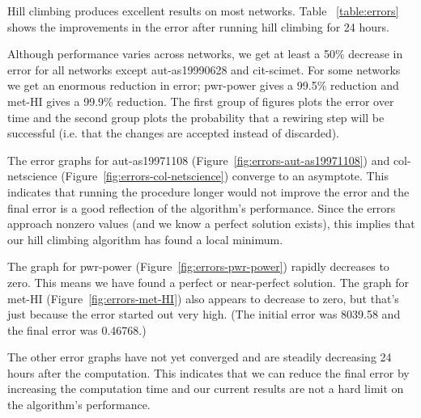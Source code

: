 Hill climbing produces excellent results on most networks.  Table ~\ref{table:errors} shows the improvements in the error after running hill climbing for 24 hours.

Although performance varies across networks, we get at least a 50\% decrease in error for all networks except aut-as19990628 and cit-scimet.  For some networks we get an enormous reduction in error; pwr-power gives a 99.5\% reduction and met-HI gives a 99.9\% reduction.  The first group of figures plots the error over time and the second group plots the probability that a rewiring step will be successful (i.e. that the changes are accepted instead of discarded).

The error graphs for aut-as19971108 (Figure~\ref{fig:errors-aut-as19971108}) and col-netscience (Figure~\ref{fig:errors-col-netscience}) converge to an asymptote.  This indicates that running the procedure longer would not improve the error and the final error is a good reflection of the algorithm's performance.  Since the errors approach nonzero values (and we know a perfect solution exists), this implies that our hill climbing algorithm has found a local minimum.

The graph for pwr-power (Figure~\ref{fig:errors-pwr-power}) rapidly decreases to zero.  This means we have found a perfect or near-perfect solution.  The graph for met-HI (Figure~\ref{fig:errors-met-HI}) also appears to decrease to zero, but that's just because the error started out very high.  (The initial error was 8039.58 and the final error was 0.46768.)

The other error graphs have not yet converged and are steadily decreasing 24 hours after the computation.  This indicates that we can reduce the final error by increasing the computation time and our current results are not a hard limit on the algorithm's performance.




